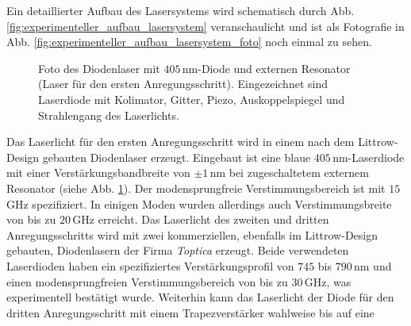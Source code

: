 Ein detaillierter Aufbau des Lasersystems wird schematisch durch Abb.
\ref{fig:experimenteller_aufbau_lasersystem} veranschaulicht und ist als
Fotografie in Abb. \ref{fig:experimenteller_aufbau_lasersystem_foto} noch einmal
zu sehen.\par
\begin{figure}[h]
 	\centering
	\caption[Diodenlaser - Foto]{Foto des Diodenlaser mit
	$405\,$nm-Diode und externen Resonator (Laser für den ersten Anregungsschritt).
	Eingezeichnet sind Laserdiode mit Kolimator, Gitter, Piezo, Auskoppelspiegel
	und Strahlengang des Laserlichts.}
	\label{fig:experimenteller_aufbau_diodenlaser_foto}
\end{figure}
Das Laserlicht für den ersten Anregungsschritt wird in einem nach dem
Littrow-Design gebauten Diodenlaser erzeugt. Eingebaut ist eine blaue
$405\,$nm-Laserdiode mit einer Verstärkungsbandbreite von $\pm1\,$nm bei
zugeschaltetem externem Resonator (siehe Abb.
\ref{fig:experimenteller_aufbau_diodenlaser_foto}). Der modensprungfreie
Verstimmungsbereich ist mit $15\,$GHz spezifiziert. In einigen Moden wurden
allerdings auch Verstimmungsbreite von bis zu $20\,$GHz erreicht. Das Laserlicht
des zweiten und dritten Anregungsschritts wird mit zwei kommerziellen, ebenfalls im Littrow-Design gebauten, Diodenlasern der Firma \textit{Toptica} erzeugt.
Beide verwendeten Laserdioden haben ein spezifiziertes Verstärkungsprofil von
$745$ bis $790\,$nm und einen modensprungfreien Verstimmungsbereich von bis
zu $30\,$GHz, was experimentell bestätigt wurde. Weiterhin kann das Laserlicht
der Diode für den dritten Anregungsschritt mit einem Trapezverstärker wahlweise bis auf eine
